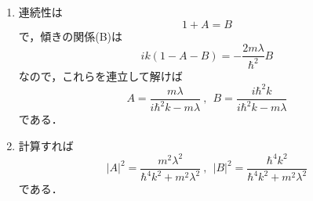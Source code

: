 \documentclass[a4paper,pdflatex,ja=standard]{bxjsarticle}
\begin{document}
\begin{enumerate}
  \item 
  連続性は
  \begin{equation}
    1+A=B
  \end{equation}
  で，傾きの関係(B)は
  \begin{equation}
    ik
    (1-A-B)
    =
    -\frac{2m\lambda}{\hbar^2}B
  \end{equation}
  なので，これらを連立して解けば
  \begin{equation}
    A
    =
    \frac{m\lambda}{i\hbar^2 k-m\lambda}
    \ ,\ \ 
    B
    =
    \frac{i\hbar^2 k}{i\hbar^2 k-m\lambda}
  \end{equation}
  である．

  \item 
  計算すれば
  \begin{equation}
    |A|^2
    =
    \frac{m^2\lambda^2}{\hbar^4 k^2+m^2\lambda^2}
    \ ,\ \ 
    |B|^2
    =
    \frac{\hbar^4 k^2}{\hbar^4 k^2+m^2\lambda^2}
  \end{equation}
  である．

\end{enumerate}
\end{document}
